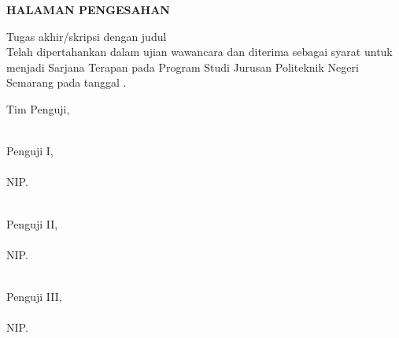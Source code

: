 
\newpage
{}
\begin{center}
        \textbf{\large \MakeUppercase{halaman pengesahan}}
\end{center}
\vspace*{1cm}
    
    \noindent Tugas akhir/skripsi dengan judul {\judulid}\\
    Telah dipertahankan dalam ujian wawancara dan diterima sebagai syarat untuk menjadi Sarjana Terapan pada Program Studi {\prodii} Jurusan {\jurusan}
    Politeknik Negeri Semarang pada tanggal .\\
    
   \vspace{-0.2cm}
    \begin{center}
        Tim Penguji,
    \end{center}
      
\vspace*{-0.5cm}   
\begin{center}
    \begin{minipage}{0.32\textwidth} 
        \hfill\\[1em]
        Penguji I,\\[2cm]
        \pengujisatu\\
        NIP. \NIPpengujisatu
    \end{minipage}
    \hfill
    \begin{minipage}{0.32\textwidth}
        \hfill\\[1em]
        Penguji II,\\[2cm]
        \pengujidua\\
        NIP. \NIPpengujidua
    \end{minipage}
    \hfill
    \begin{minipage}{0.32\textwidth}
        \hfill\\[1em]
        Penguji III,\\[2cm]
        \pengujitiga\\
        NIP. \NIPpengujitiga
    \end{minipage}
\end{center}


